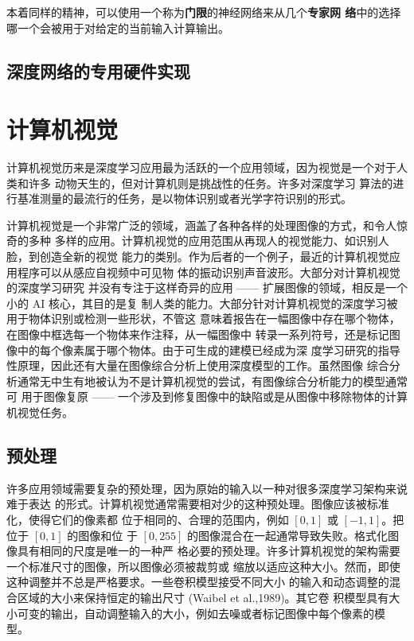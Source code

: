 本着同样的精神，可以使用一个称为\textbf{门限}的神经网络来从几个\textbf{专家网
  络}中的选择哪一个会被用于对给定的当前输入计算输出。

\subsection{深度网络的专用硬件实现}
\label{subsec:specialized_hardware_implementations_of_deep_networks}

\section{计算机视觉}
\label{sec:computer_vision}

计算机视觉历来是深度学习应用最为活跃的一个应用领域，因为视觉是一个对于人类和许多
动物天生的，但对计算机则是挑战性的任务\citep{ballard1983parallel}。许多对深度学习
算法的进行基准测量的最流行的任务，是以物体识别或者光学字符识别的形式。

计算机视觉是一个非常广泛的领域，涵盖了各种各样的处理图像的方式，和令人惊奇的多种
多样的应用。计算机视觉的应用范围从再现人的视觉能力、如识别人脸，到创造全新的视觉
能力的类别。作为后者的一个例子，最近的计算机视觉应用程序可以从感应自视频中可见物
体的振动识别声音波形\citep{Davis2014VisualMic}。大部分对计算机视觉的深度学习研究
并没有专注于这样奇异的应用 —— 扩展图像的领域，相反是一个小的 AI 核心，其目的是复
制人类的能力。大部分针对计算机视觉的深度学习被用于物体识别或检测一些形状，不管这
意味着报告在一幅图像中存在哪个物体，在图像中框选每一个物体来作注释，从一幅图像中
转录一系列符号，还是标记图像中的每个像素属于哪个物体。由于可生成的建模已经成为深
度学习研究的指导性原理，因此还有大量在图像综合分析上使用深度模型的工作。虽然图像
综合分析通常无中生有地被认为不是计算机视觉的尝试，有图像综合分析能力的模型通常可
用于图像复原 —— 一个涉及到修复图像中的缺陷或是从图像中移除物体的计算机视觉任务。

\subsection{预处理}
\label{subsec:preprocessing}

许多应用领域需要复杂的预处理，因为原始的输入以一种对很多深度学习架构来说难于表达
的形式。计算机视觉通常需要相对少的这种预处理。图像应该被标准化，使得它们的像素都
位于相同的、合理的范围内，例如 $[0,1]$ 或 $[-1,1]$。把位于 $[0,1]$ 的图像和位
于 $[0,255]$ 的图像混合在一起通常导致失败。格式化图像具有相同的尺度是唯一的一种严
格必要的预处理。许多计算机视觉的架构需要一个标准尺寸的图像，所以图像必须被裁剪或
缩放以适应这种大小。然而，即使这种调整并不总是严格要求。一些卷积模型接受不同大小
的输入和动态调整的混合区域的大小来保持恒定的输出尺寸 (Waibel et al.,1989)。其它卷
积模型具有大小可变的输出，自动调整输入的大小，例如去噪或者标记图像中每个像素的模
型\citep{Hadsell-RSS-07}。

